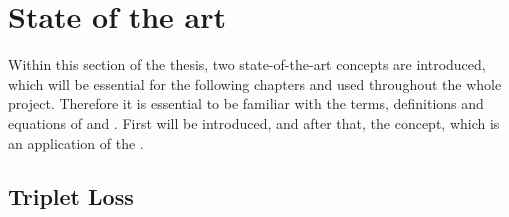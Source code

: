 \section{State of the art}
\label{sec:State-of-art}
Within this section of the thesis, two state-of-the-art concepts are introduced, which will be essential for the following chapters and used throughout the whole project. Therefore it is essential to be familiar with the terms, definitions and equations of  and . First  will be introduced, and after that, the  concept, which is an application of the .

\subsection{Triplet Loss}
\label{sub:Triplet-Loss}

